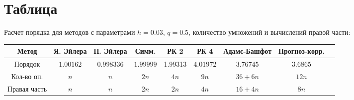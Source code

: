 \documentclass[12pt, a4paper]{article}
\begin{document}
\section{Таблица}

Расчет порядка для методов с параметрами $h = 0{.}03$,  $q = 0{.}5$, количество умножений и вычислений правой части:
\noindent\begin{center}
\hspace*{-25mm}\begin{tabular}{|c|c|c|c|c|c|c|c|c|}
\hline
Метод & Я. Эйлера  & Н. Эйлера  & Симм.  & РК 2 & РК 4  &Адамс-Башфот & Прогноз-корр. \\
\hline
Порядок &$1{.}00162$&0{.}998336&$1{.}99999$&1{.}99313&$4{.}01972$&$3{.}76745$&$3{.}6865$\\
\hline
Кол-во оп. &$n$&$n$&$2n$&$4n$&$9n$&$36 + 6n$&$12n$\\
\hline
Правая часть &$n$&$n$&$2n$&$2n$&$4n$&$16 + 4n$&$8n$\\
\hline
\end{tabular}
\end{center}
\newpage
\end{document}
